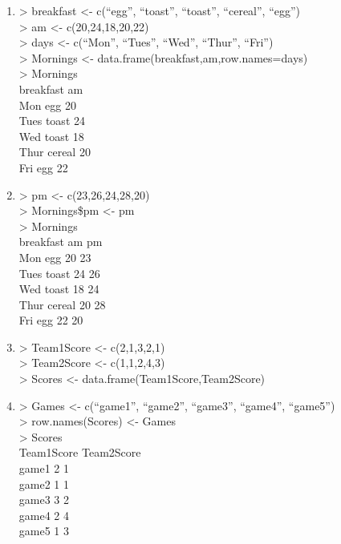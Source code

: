 \documentclass[
]{book}
\begin{document}
\begin{enumerate}
\def\labelenumi{\arabic{enumi}.}
\item
  \textgreater{} breakfast \textless- c(``egg'', ``toast'', ``toast'', ``cereal'', ``egg'')\\
  \textgreater{} am \textless- c(20,24,18,20,22)\\
  \textgreater{} days \textless- c(``Mon'', ``Tues'', ``Wed'', ``Thur'', ``Fri'')\\
  \textgreater{} Mornings \textless- data.frame(breakfast,am,row.names=days)\\
  \textgreater{} Mornings\\
  breakfast am\\
  Mon egg 20\\
  Tues toast 24\\
  Wed toast 18\\
  Thur cereal 20\\
  Fri egg 22
\item
  \textgreater{} pm \textless- c(23,26,24,28,20)\\
  \textgreater{} Mornings\$pm \textless- pm\\
  \textgreater{} Mornings\\
  breakfast am pm\\
  Mon egg 20 23\\
  Tues toast 24 26\\
  Wed toast 18 24\\
  Thur cereal 20 28\\
  Fri egg 22 20
\item
  \textgreater{} Team1Score \textless- c(2,1,3,2,1)\\
  \textgreater{} Team2Score \textless- c(1,1,2,4,3)\\
  \textgreater{} Scores \textless- data.frame(Team1Score,Team2Score)
\item
  \textgreater{} Games \textless- c(``game1'', ``game2'', ``game3'', ``game4'', ``game5'')\\
  \textgreater{} row.names(Scores) \textless- Games\\
  \textgreater{} Scores\\
  Team1Score Team2Score\\
  game1 2 1\\
  game2 1 1\\
  game3 3 2\\
  game4 2 4\\
  game5 1 3
\end{enumerate}
\end{document}
